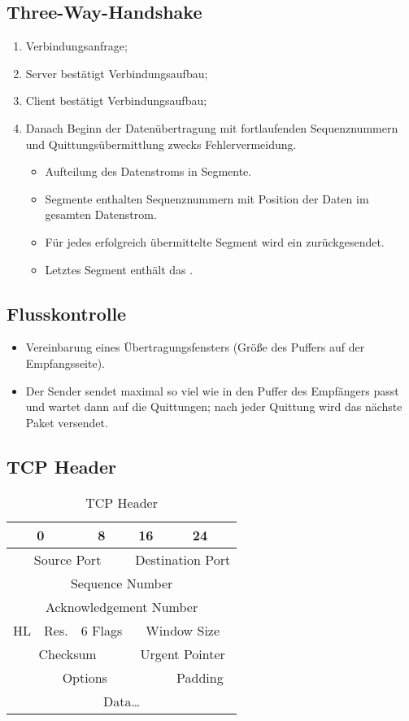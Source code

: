 \subsection{Three-Way-Handshake}
\begin{enumerate}
\item Verbindungsanfrage; 
\item Server bestätigt Verbindungsaufbau; 
\item Client bestätigt Verbindungsaufbau; 
\item Danach Beginn der Datenübertragung mit fortlaufenden Sequenznummern und Quittungsübermittlung zwecks Fehlervermeidung.

\begin{itemize}
\item Aufteilung des Datenstroms in Segmente.
\item Segmente enthalten Sequenznummern mit Position der Daten im gesamten Datenstrom.
\item Für jedes erfolgreich übermittelte Segment wird ein  zurückgesendet.
\item Letztes Segment enthält das .
\end{itemize}
\end{enumerate}

\subsection{Flusskontrolle}
\begin{itemize}
\item Vereinbarung eines Übertragungsfensters (Größe des Puffers auf der Empfangsseite).
\item Der Sender sendet maximal so viel wie in den Puffer des Empfängers passt und wartet dann auf die Quittungen; nach jeder Quittung wird das nächste Paket versendet.
\end{itemize}

\subsection{TCP Header}

\begin{table}[h]
\centering
\begin{tabular}{|c|c|c|c|c|}
	\hline
	\multicolumn{2}{|c|}{0} & 8 & 16 & 24\tabularnewline
\hline 
\hline 
\multicolumn{3}{|c|}{Source Port} & \multicolumn{2}{c|}{Destination Port}\tabularnewline
\hline 
\multicolumn{5}{|c|}{Sequence Number}\tabularnewline
\hline 
\multicolumn{5}{|c|}{Acknowledgement Number}\tabularnewline
\hline 
HL & Res. & 6 Flags & \multicolumn{2}{c|}{Window Size}\tabularnewline
\hline 
\multicolumn{3}{|c|}{Checksum} & \multicolumn{2}{c|}{Urgent Pointer}\tabularnewline
\hline 
\multicolumn{4}{|c|}{Options} & Padding\tabularnewline
\hline 
\multicolumn{5}{|c|}{Data\ldots}\tabularnewline
\hline
\end{tabular}
\caption{TCP Header}
\end{table}


